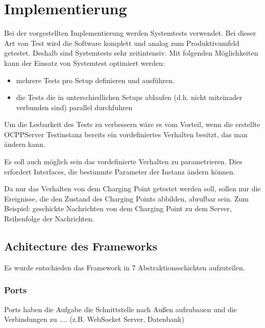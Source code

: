 \section{Implementierung}
    Bei der vorgestellten Implementierung werden Systemtests verwendet. Bei dieser Art von Test wird die Software komplett und analog zum Produktivumfeld getestet. 
    Deshalb sind Systemtests sehr zeitintensiv. Mit folgenden Möglichkeiten kann der Einsatz von Systemtest optimiert werden:

    \begin{itemize}
        \item mehrere Tests pro Setup definieren und ausführen.
        \item die Tests die in unterschiedlichen Setups ablaufen (d.h. nicht miteinader verbunden sind) 
        parallel durchfuhren
    \end{itemize}


    Um die Lesbarkeit des Tests zu verbessern wäre es vom Vorteil, wenn die erstellte OCPPServer Testinstanz bereits ein vordefiniertes Verhalten besitzt, 
    das man ändern kann.

    Es soll auch möglich sein das vordefinierte Verhalten zu parametrieren. 
    Dies erfordert Interfaces, die bestimmte Parameter der Instanz ändern können.

    Da nur das Verhalten von dem Charging Point getestet werden soll, sollen nur die Ereignisse, die den Zustand des Charging Points abbilden, abrufbar sein.
    Zum Beispiel: geschickte Nachrichten von dem Charging Point zu dem Server, Reihenfolge der Nachrichten.

    \subsection{Achitecture des Frameworks}
    Es wurde entschieden das Framework in 7 Abstraktionsschichten aufzuteilen.
        \subsubsection{Ports}
        Ports haben die Aufgabe die Schnittstelle nach Außen aufzubauen und die Verbindungen zu .... (z.B. WebSocket Server, Datenbank)

